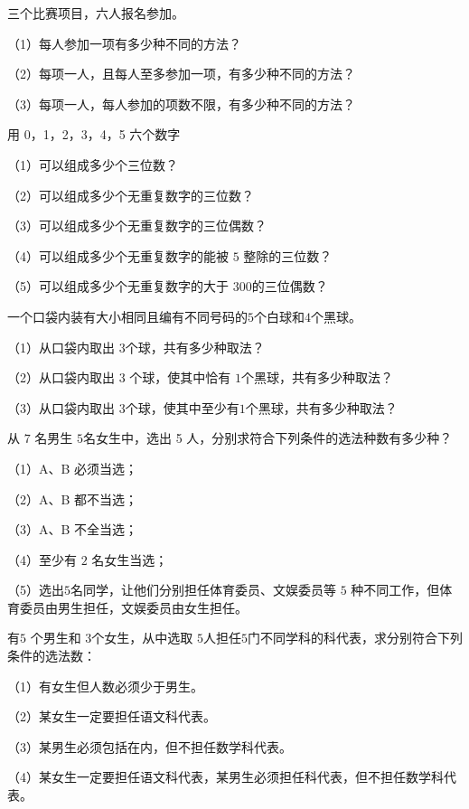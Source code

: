 \hw
\begin{homework}
    三个比赛项目，六人报名参加。

（1）每人参加一项有多少种不同的方法？

（2）每项一人，且每人至多参加一项，有多少种不同的方法？

（3）每项一人，每人参加的项数不限，有多少种不同的方法？
\end{homework}
\begin{homework}
 用 0，1，2，3，4，5 六个数字

（1）可以组成多少个三位数？

（2）可以组成多少个无重复数字的三位数？

（3）可以组成多少个无重复数字的三位偶数？

（4）可以组成多少个无重复数字的能被 $5$ 整除的三位数？

（5）可以组成多少个无重复数字的大于 $300 $的三位偶数？
\end{homework}
\begin{homework}
    一个口袋内装有大小相同且编有不同号码的$ 5 $个白球和$ 4 $个黑球。


（1）从口袋内取出 $3 $个球，共有多少种取法？

（2）从口袋内取出 $3$ 个球，使其中恰有 $1 $个黑球，共有多少种取法？

（3）从口袋内取出 $3 $个球，使其中至少有$ 1 $个黑球，共有多少种取法？
\end{homework}
\begin{homework}
    从 $7$ 名男生 $5 $名女生中，选出 5 人，分别求符合下列条件的选法种数有多少种？

（1）A、B 必须当选；

（2）A、B 都不当选；

（3）A、B 不全当选；

（4）至少有 $2$ 名女生当选；

（5）选出$ 5 $名同学，让他们分别担任体育委员、文娱委员等 $5$ 种不同工作，但体育委员由男生担任，文娱委员由女生担任。
\end{homework}
\begin{homework}
    有$ 5$ 个男生和 $3 $个女生，从中选取 $5 $人担任$ 5 $门不同学科的科代表，求分别符合下列条件的选法数：

（1）有女生但人数必须少于男生。

（2）某女生一定要担任语文科代表。

（3）某男生必须包括在内，但不担任数学科代表。

（4）某女生一定要担任语文科代表，某男生必须担任科代表，但不担任数学科代表。
\end{homework}
